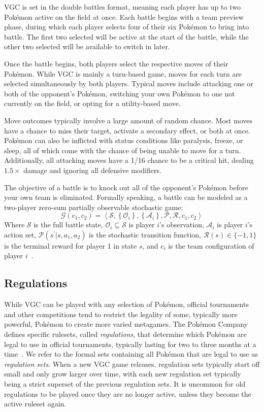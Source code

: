VGC is set in the double battles format, meaning each player has up to two Pokémon active on the field at once.
Each battle begins with a team preview phase, during which each player selects four of their six Pokémon to bring into battle.
The first two selected will be active at the start of the battle, while the other two selected will be available to switch in later.

Once the battle begins, both players select the respective moves of their Pokémon.
While VGC is mainly a turn-based game, moves for each turn are selected simultaneously by both players.
Typical moves include attacking one or both of the opponent's Pokémon, switching your own Pokémon to one not currently on the field, or opting for a utility-based move.

Move outcomes typically involve a large amount of random chance.
Most moves have a chance to miss their target, activate a secondary effect, or both at once.
Pokémon can also be inflicted with status conditions like paralysis, freeze, or sleep, all of which come with the chance of being unable to move for a turn.
Additionally, all attacking moves have a 1/16 chance to be a critical hit, dealing $1.5\times$ damage and ignoring all defensive modifiers.

The objective of a battle is to knock out all of the opponent's Pokémon before your own team is eliminated.
Formally speaking, a battle can be modeled as a two-player zero-sum partially observable stochastic game:
\begin{equation}
    \mathcal{G}(c_1, c_2) = \left\langle \mathcal{S}, \left\{\mathcal{O}_i\right\}, \left\{\mathcal{A}_i\right\}, \mathcal{P}, \mathcal{R}, c_1, c_2 \right\rangle
\end{equation}
Where $\mathcal{S}$ is the full battle state, $\mathcal{O}_i \subseteq \mathcal{S}$ is player $i$'s observation, $\mathcal{A}_i$ is player $i$'s action set, $\mathcal{P}(s^\prime | s, a_1, a_2)$ is the stochastic transition function, $\mathcal{R}(s) \in \{-1, 1\}$ is the terminal reward for player 1 in state $s$, and $c_i$ is the team configuration of player $i$~\cite{angliss2025vgc}.

\subsection{Regulations} \label{sec:vgc:regulations}
While VGC can be played with any selection of Pokémon, official tournaments and other competitions tend to restrict the legality of some, typically more powerful, Pokémon to create more varied metagames.
The Pokémon Company defines specific rulesets, called \textit{regulations}, that determine which Pokémon are legal to use in official tournaments, typically lasting for two to three months at a time~\cite{vgc-rules-regulations}.
We refer to the formal sets containing all Pokémon that are legal to use as \textit{regulation sets}.
When a new VGC game releases, regulation sets typically start off small and only grow larger over time, with each new regulation set typically being a strict superset of the previous regulation sets.
It is uncommon for old regulations to be played once they are no longer active, unless they become the active ruleset again.

